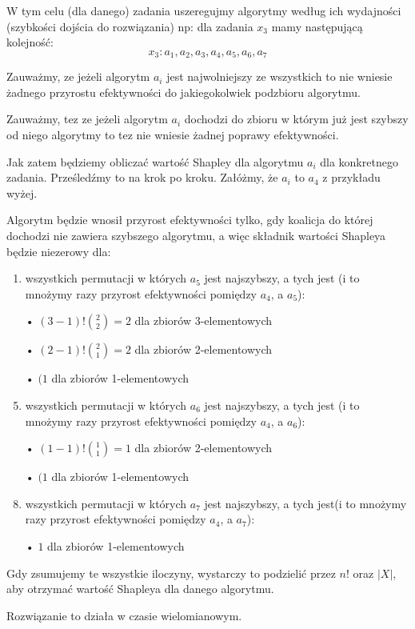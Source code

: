 \documentclass[oneside]{book}
\begin{document}
 
 W tym celu (dla danego) zadania uszeregujmy algorytmy według ich wydajności (szybkości dojścia do rozwiązania) np: dla zadania $x_3$ mamy następującą kolejność:
  $$  x_3:  a_1, a_2, a_3, a_4, a_5, a_6, a_7 $$
  
 Zauważmy, ze jeżeli algorytm $a_i$ jest najwolniejszy ze wszystkich to nie wniesie żadnego przyrostu efektywności do jakiegokolwiek podzbioru algorytmu.
 
 Zauważmy, tez ze jeżeli algorytm $a_i$ dochodzi do zbioru w którym już jest szybszy od niego algorytmy to tez nie wniesie żadnej poprawy efektywności.
 
 Jak zatem będziemy obliczać wartość Shapley dla algorytmu $a_i$ dla konkretnego zadania. Prześledźmy to na krok po kroku. Załóżmy, że $a_i$ to $a_4$ z przykładu wyżej.
 

Algorytm będzie wnosił przyrost efektywności tylko, gdy koalicja do której dochodzi nie zawiera szybszego algorytmu, a więc składnik wartości Shapleya będzie niezerowy dla:
\begin{enumerate}
\item wszystkich permutacji w których $a_5$ jest najszybszy, a tych jest (i to mnożymy razy przyrost efektywności pomiędzy $a_4$, a $a_5$):
\item[•] $(3-1)! {2 \choose 2} = 2$ dla zbiorów 3-elementowych 
\item[•] $(2-1)! {2 \choose 1} = 2$ dla zbiorów 2-elementowych 
\item[•] $(1$ dla zbiorów 1-elementowych   

\item wszystkich permutacji w których $a_6$ jest najszybszy, a tych jest (i to mnożymy razy przyrost efektywności pomiędzy $a_4$, a $a_6$):
\item[•] $(1-1)!  {1 \choose 1}= 1$ dla zbiorów 2-elementowych 
\item[•] $(1$ dla zbiorów 1-elementowych   
\item wszystkich permutacji w których $a_7$ jest najszybszy, a tych jest(i to mnożymy razy przyrost efektywności pomiędzy $a_4$, a $a_7$):
\item[•] $1$ dla zbiorów 1-elementowych   
\end{enumerate}


Gdy zsumujemy te wszystkie iloczyny, wystarczy to podzielić przez $n!$ oraz $|X|$, aby otrzymać wartość Shapleya dla danego algorytmu.

Rozwiązanie to działa w czasie wielomianowym.
 
\end{document}
